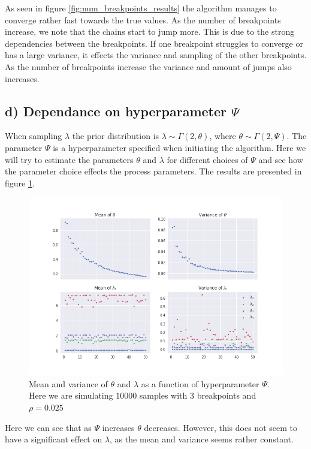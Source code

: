 \documentclass[a4paper]{article}
\begin{document}
As seen in figure \ref{fig:num_breakpoints_results} the algorithm manages to converge rather fast towards the true values. As the number of breakpoints increase, we note that the chains start to jump more. This is due to the strong dependencies between the breakpoints. If one breakpoint struggles to converge or has a large variance, it effects the variance and sampling of the other breakpoints. As the number of breakpoints increase the variance and amount of jumps also increases.

\subsection*{d) Dependance on hyperparameter $\Psi$}
When sampling $\lambda$ the prior distribution is  $\lambda \sim \Gamma(2,\theta)$, where $\theta \sim \Gamma(2,\Psi)$. The parameter $\Psi$ is a hyperparameter specified when initiating the algorithm. Here we will try to estimate the parameters $\theta$ and $\lambda$ for different choices of $\Psi$ and see how the parameter choice effects the process parameters. The results are presented in figure \ref{fig:different_psi}.

\begin{figure}[H]
    \centering
    \includegraphics[width = 1.0\textwidth]{images/psi.png} 
    \caption{Mean and variance of $\theta$ and $\lambda$ as a function of hyperparameter $\Psi$. Here we are simulating $10 000$ samples with 3 breakpoints and $\rho = 0.025$}
    \label{fig:different_psi}
\end{figure}

Here we can see that as $\Psi$ increases $\theta$ decreases. However, this does not seem to have a significant effect on $\lambda$, as the mean and variance seems rather constant.
\end{document}
